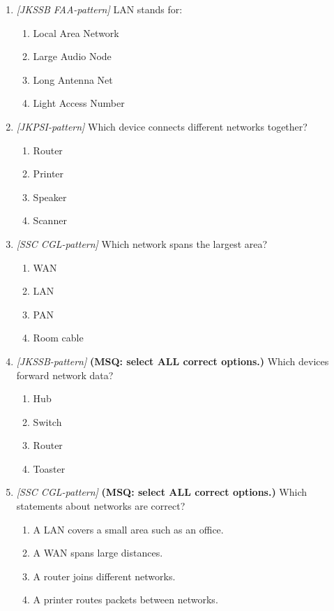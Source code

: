 \documentclass[11pt]{article}
\begin{document}
\begin{enumerate}[label=\textbf{Q\arabic*.}, leftmargin=*]
\item \textit{[JKSSB FAA-pattern]} LAN stands for:
  \begin{enumerate}[label=\Alph*.]
    \item Local Area Network
    \item Large Audio Node
    \item Long Antenna Net
    \item Light Access Number
  \end{enumerate}
\item \textit{[JKPSI-pattern]} Which device connects different networks together?
  \begin{enumerate}[label=\Alph*.]
    \item Router
    \item Printer
    \item Speaker
    \item Scanner
  \end{enumerate}
\item \textit{[SSC CGL-pattern]} Which network spans the largest area?
  \begin{enumerate}[label=\Alph*.]
    \item WAN
    \item LAN
    \item PAN
    \item Room cable
  \end{enumerate}
\item \textit{[JKSSB-pattern]} \textbf{(MSQ: select ALL correct options.)} Which devices forward network data?
  \begin{enumerate}[label=\Alph*.]
    \item Hub
    \item Switch
    \item Router
    \item Toaster
  \end{enumerate}
\item \textit{[SSC CGL-pattern]} \textbf{(MSQ: select ALL correct options.)} Which statements about networks are correct?
  \begin{enumerate}[label=\Alph*.]
    \item A LAN covers a small area such as an office.
    \item A WAN spans large distances.
    \item A router joins different networks.
    \item A printer routes packets between networks.
  \end{enumerate}
\end{enumerate}
\def\JKSSBLessonID{40}\def\JKSSBAnswers{0}
\end{document}
